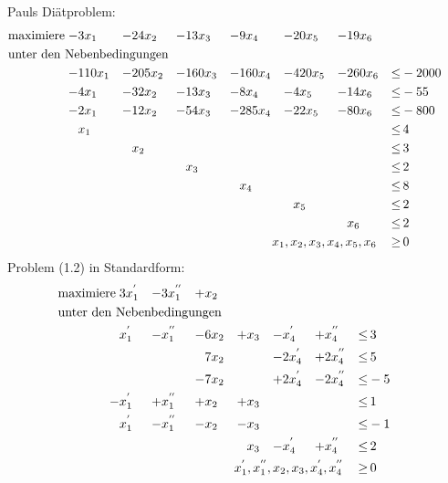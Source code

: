 \documentclass[10pt,a4paper,oneside,ngerman,numbers=noenddot]{scrartcl}
\begin{document}
	\subsection{} %
\section{} %
	\subsection{} %
	Pauls Diätproblem:\\
	\begin{alignat*}{7}
		\text{maximiere}\; -& 3x_{1} &-& 24x_{2} &-& 13x_{3} &-& 9x_{4} &-& 20x_{5} &-& 19x_{6} && \\
		\multicolumn{14}{l}{\text{unter den Nebenbedingungen}} && \\
		- & 110x_{1} &-& 205x_{2} &-& 160x_{3} &-& 160x_{4} &-& 420x_{5} &-& 260x_{6} &\leq & -2000 \\
		-& 4x_{1} &-& 32x_{2} &-& 13x_{3} &-& 8x_{4} &-& 4x_{5} &-& 14x_{6} &\leq & -55 \\
		-& 2x_{1} &-& 12x_{2} &-& 54x_{3} &-& 285x_{4} &-& 22x_{5} &-& 80x_{6} &\leq & -800 \\
		& x_{1} && && && && && &\leq &\, 4 \\
		& && x_{2} && && && && &\leq &\, 3 \\
		& && && x_{3} && && && &\leq &\, 2 \\
		& && && && x_{4} && && &\leq &\, 8 \\
		& && && && && x_{5} && &\leq &\, 2 \\
		& && && && && && x_{6} &\leq &\, 2 \\
		\multicolumn{12}{r}{$x_{1}, x_{2}, x_{3}, x_{4}, x_{5}, x_{6}$} \,&\geq &\, 0
		\end{alignat*}
		Problem (1.2) in Standardform:\\
		\begin{alignat*}{7}
		\text{maximiere}\; & 3x_{1}^{'} &-& 3x_{1}^{''} &+& x_{2} && && && \\
		\multicolumn{14}{l}{\text{unter den Nebenbedingungen}} && \\
		& x_{1}^{'} &-& x_{1}^{''} &-& 6x_{2} &+& x_{3} &-& x_{4}^{'} &+& x_{4}^{''} &\leq &\, 3 \\
		& && && 7x_{2} && &-& 2x_{4}^{'} &+& 2x_{4}^{''} &\leq &\, 5 \\
		& && &-& 7x_{2} && &+& 2x_{4}^{'} &-& 2x_{4}^{''} &\leq & -5 \\
		-& x_{1}^{'} &+& x_{1}^{''} &+& x_{2} &+& x_{3} && && &\leq &\, 1 \\
		& x_{1}^{'} &-& x_{1}^{''} &-& x_{2} &-& x_{3} && && &\leq & -1 \\
		& && && && x_{3} &-& x_{4}^{'} &+& x_{4}^{''} &\leq &\, 2 \\
		\multicolumn{12}{r}{$x_{1}^{'}, x_{1}^{''}, x_{2}, x_{3}, x_{4}^{'}, x_{4}^{''}$} \,&\geq &\, 0
		\end{alignat*}
	\subsection{} %
\end{document}
